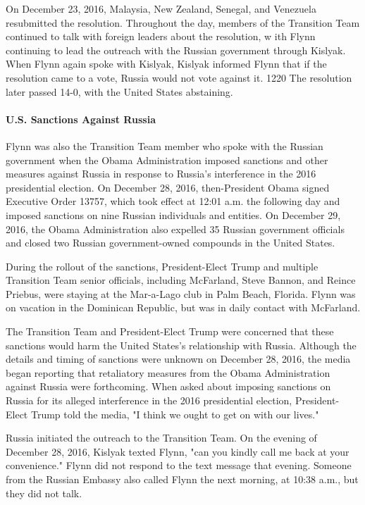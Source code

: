 On December 23, 2016, Malaysia, New Zealand, Senegal, and Venezuela resubmitted the resolution.%
Throughout the day, members of the Transition Team continued to talk with foreign leaders about the resolution, w ith Flynn continuing to lead the outreach with the Russian government through Kislyak.%
When Flynn again spoke with Kislyak, Kislyak informed Flynn that if the resolution came to a vote, Russia would not vote against it. 1220 The resolution later passed 14-0, with the United States abstaining.%

\paragraph{U.S. Sanctions Against Russia}

Flynn was also the Transition Team member who spoke with the Russian government when the Obama Administration imposed sanctions and other measures against Russia in response to Russia's interference in the 2016 presidential election.
On December 28, 2016, then-President Obama signed Executive Order 13757, which took effect at 12:01 a.m. the following day and imposed sanctions on nine Russian individuals and entities.%
On December 29, 2016, the Obama Administration also expelled 35 Russian government officials and closed two Russian government-owned compounds in the United States.%

During the rollout of the sanctions, President-Elect Trump and multiple Transition Team senior officials, including McFarland, Steve Bannon, and Reince Priebus, were staying at the Mar-a-Lago club in Palm Beach, Florida.
Flynn was on vacation in the Dominican Republic,%
but was in daily contact with McFarland.%

The Transition Team and President-Elect Trump were concerned that these sanctions would harm the United States's relationship with Russia.%
Although the details and timing of sanctions were unknown on December 28, 2016, the media began reporting that retaliatory measures from the Obama Administration against Russia were forthcoming.%
When asked about imposing sanctions on Russia for its alleged interference in the 2016 presidential election, President-Elect Trump told the media, "I think we ought to get on with our lives."%

Russia initiated the outreach to the Transition Team.
On the evening of December 28, 2016, Kislyak texted Flynn, "can you kindly call me back at your convenience."%
Flynn did not respond to the text message that evening.
Someone from the Russian Embassy also called Flynn the next morning, at 10:38 a.m., but they did not talk.%

